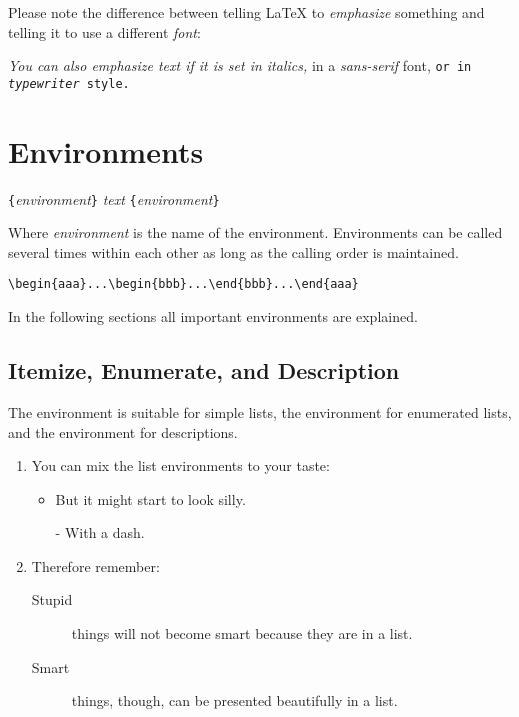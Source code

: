 Please note the difference between telling \LaTeX{} to
\emph{emphasize} something and telling it to use a different
\emph{font}:

\begin{example}
\textit{You can also
  \emph{emphasize} text if 
  it is set in italics,} 
\textsf{in a 
  \emph{sans-serif} font,}
\texttt{or in 
  \emph{typewriter} style.}
\end{example}

\section{Environments} \label{env}

\begin{lscommand}
\verb|{|\emph{environment}\verb|}|\quad
   \emph{text}\quad
{}\verb|{|\emph{environment}\verb|}|
\end{lscommand}
\noindent Where \emph{environment} is the name of the environment. Environments can be
called several times within each other as long as the calling order is
maintained.
\begin{code}
\verb|\begin{aaa}...\begin{bbb}...\end{bbb}...\end{aaa}|
\end{code}

\noindent In the following sections all important environments are explained.

\subsection{Itemize, Enumerate, and Description}

The  environment is suitable for simple lists, the
 environment for enumerated lists, and the
 environment for descriptions.

\begin{example}
\flushleft
\begin{enumerate}
\item You can mix the list
environments to your taste:
\begin{itemize}
\item But it might start to
look silly. 
\item[-] With a dash.
\end{itemize}
\item Therefore remember:
\begin{description}
\item[Stupid] things will not
become smart because they are
in a list.
\item[Smart] things, though, can be
presented beautifully in a list.
\end{description}
\end{enumerate}
\end{example}
 
